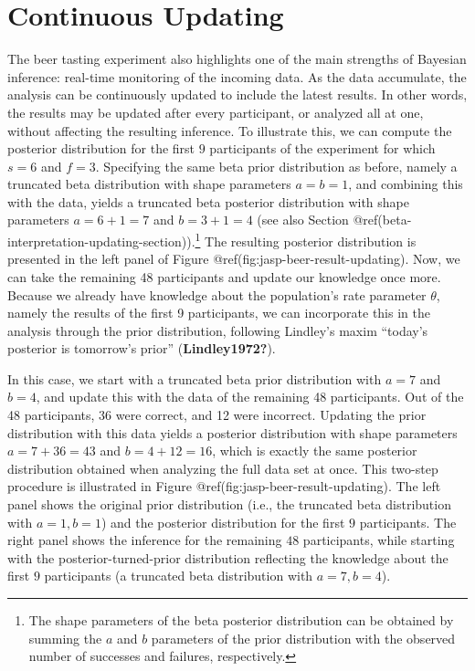 \documentclass[
  letterpaper,
  DIV=11,
  numbers=noendperiod]{scrreprt}
\begin{document}
\hypertarget{continuous-updating}{%
\section{Continuous Updating}\label{continuous-updating}}

The beer tasting experiment also highlights one of the main strengths of
Bayesian inference: real-time monitoring of the incoming data. As the
data accumulate, the analysis can be continuously updated to include the
latest results. In other words, the results may be updated after every
participant, or analyzed all at one, without affecting the resulting
inference. To illustrate this, we can compute the posterior distribution
for the first \(9\) participants of the experiment for which \(s = 6\)
and \(f = 3\). Specifying the same beta prior distribution as before,
namely a truncated beta distribution with shape parameters
\(a = b = 1\), and combining this with the data, yields a truncated beta
posterior distribution with shape parameters \(a = 6 + 1 = 7\) and
\(b = 3 + 1 = 4\) (see also Section
@ref(beta-interpretation-updating-section)).\footnote{ 
The shape parameters of the beta posterior distribution can be obtained by summing the $a$ and $b$ parameters of the prior distribution with the observed number of successes and failures, respectively.}
The resulting posterior distribution is presented in the left panel of
Figure @ref(fig:jasp-beer-result-updating). Now, we can take the
remaining 48 participants and update our knowledge once more. Because we
already have knowledge about the population's rate parameter \(\theta\),
namely the results of the first 9 participants, we can incorporate this
in the analysis through the prior distribution, following Lindley's
maxim ``today's posterior is tomorrow's prior'' (\textbf{Lindley1972?}).

In this case, we start with a truncated beta prior distribution with
\(a = 7\) and \(b = 4\), and update this with the data of the remaining
48 participants. Out of the 48 participants, 36 were correct, and 12
were incorrect. Updating the prior distribution with this data yields a
posterior distribution with shape parameters \(a = 7 + 36 = 43\) and
\(b = 4 + 12 = 16\), which is exactly the same posterior distribution
obtained when analyzing the full data set at once. This two-step
procedure is illustrated in Figure @ref(fig:jasp-beer-result-updating).
The left panel shows the original prior distribution (i.e., the
truncated beta distribution with \(a = 1, b = 1\)) and the posterior
distribution for the first \(9\) participants. The right panel shows the
inference for the remaining \(48\) participants, while starting with the
posterior-turned-prior distribution reflecting the knowledge about the
first \(9\) participants (a truncated beta distribution with
\(a = 7, b = 4\)).
\end{document}
